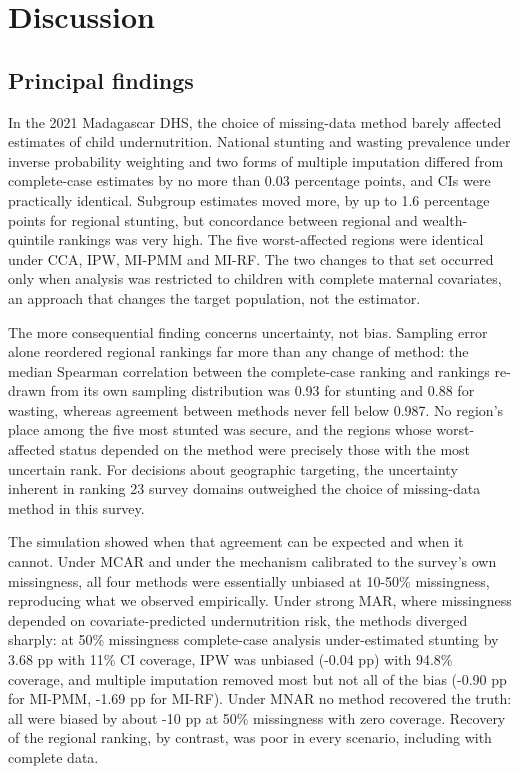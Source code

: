 \documentclass[11pt,a4paper]{article}
\begin{document}
\section{Discussion}\label{discussion}

\subsection{Principal findings}\label{principal-findings}

In the 2021 Madagascar DHS, the choice of missing-data method barely
affected estimates of child undernutrition. National stunting and
wasting prevalence under inverse probability weighting and two forms of
multiple imputation differed from complete-case estimates by no more
than 0.03 percentage points, and CIs were practically identical.
Subgroup estimates moved more, by up to 1.6 percentage points for
regional stunting, but concordance between regional and wealth-quintile
rankings was very high. The five worst-affected regions were identical
under CCA, IPW, MI-PMM and MI-RF. The two changes to that set occurred
only when analysis was restricted to children with complete maternal
covariates, an approach that changes the target population, not the
estimator.

The more consequential finding concerns uncertainty, not bias. Sampling
error alone reordered regional rankings far more than any change of
method: the median Spearman correlation between the complete-case
ranking and rankings re-drawn from its own sampling distribution was
0.93 for stunting and 0.88 for wasting, whereas agreement between
methods never fell below 0.987. No region's place among the five most
stunted was secure, and the regions whose worst-affected status depended
on the method were precisely those with the most uncertain rank. For
decisions about geographic targeting, the uncertainty inherent in
ranking 23 survey domains outweighed the choice of missing-data method
in this survey.

The simulation showed when that agreement can be expected and when it
cannot. Under MCAR and under the mechanism calibrated to the survey's
own missingness, all four methods were essentially unbiased at 10-50\%
missingness, reproducing what we observed empirically. Under strong MAR,
where missingness depended on covariate-predicted undernutrition risk,
the methods diverged sharply: at 50\% missingness complete-case analysis
under-estimated stunting by 3.68 pp with 11\% CI coverage, IPW was
unbiased (-0.04 pp) with 94.8\% coverage, and multiple imputation
removed most but not all of the bias (-0.90 pp for MI-PMM, -1.69 pp for
MI-RF). Under MNAR no method recovered the truth: all were biased by
about -10 pp at 50\% missingness with zero coverage. Recovery of the
regional ranking, by contrast, was poor in every scenario, including
with complete data.
\end{document}
